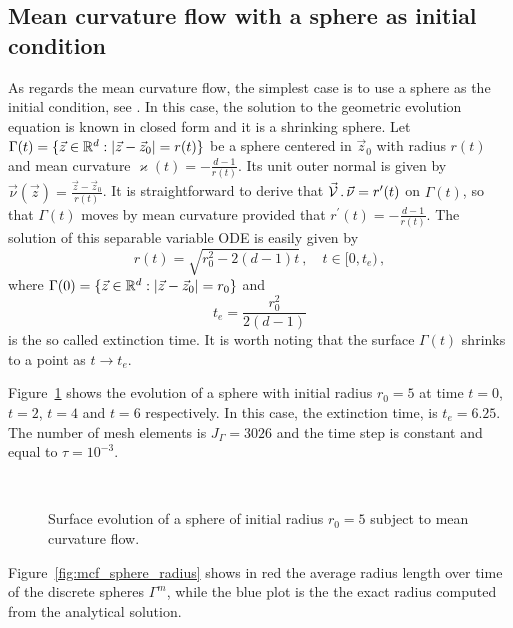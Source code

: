 \subsection{Mean curvature flow with a sphere as initial condition}
\label{subsec:mc_sphere}
As regards the mean curvature flow, the simplest case is to use a sphere as the
initial condition, see \cite{Ilmanen98}. In this case, the solution to the
geometric evolution equation is known in closed form and it is a shrinking
sphere. Let $\Gamma(t) = \{ \vec z \in {\mathbb R}^d : |\vec z -\vec z_0| = r(t) \}$ be
a sphere centered in $\vec z_0$ with radius $r(t)$ and mean curvature
$\varkappa(t) = -\frac{d-1}{r(t)}$. Its unit outer normal is given by
$\vec \nu(\vec{z}) = \frac{\vec z - \vec z_0}{r(t)}$. It is straightforward to
derive that $\vec{\mathcal{V}}\,.\,\vec\nu = r^{\prime}(t)$ on $\Gamma(t)$, so that
$\Gamma(t)$ moves by mean curvature provided that $r^{\prime}(t) = - \frac{d -
1}{r(t)}$. The solution of this separable variable ODE is easily given by
\begin{equation}
r(t) = \sqrt{r_0^2 - 2(d - 1)t}\,, \quad t\in [0,t_e)\,,
\end{equation}
where $\Gamma(0) = \{ \vec z \in {\mathbb R}^d : |\vec z -\vec z_0| = r_0 \}$ and
\begin{equation}
t_e=\frac{r_0^2}{2(d - 1)}
\end{equation}
is the so called extinction time. It is worth noting that the surface
$\Gamma(t)$ shrinks to a point as $t \to t_e$.

Figure~\ref{fig:mcf_sphere} shows the evolution of a sphere with initial radius
$r_0=5$ at time $t=0$, $t=2$, $t=4$ and $t=6$ respectively. In this case, the
extinction time, is $t_e=6.25$. The number of mesh elements is $J_\Gamma=3026$
and the time step is constant and equal to $\tau=10^{-3}$.

\begin{figure}[htbp]
\centering
{}
\\
\caption[Mean curvature flow shrinking sphere]{Surface evolution of a sphere of
initial radius $r_0=5$ subject to mean curvature flow.}
\label{fig:mcf_sphere}
\end{figure}

Figure~\ref{fig:mcf_sphere_radius} shows in red the average radius length
over time of the discrete spheres $\Gamma^m$, while the blue plot is the the
exact radius computed from the analytical solution.

